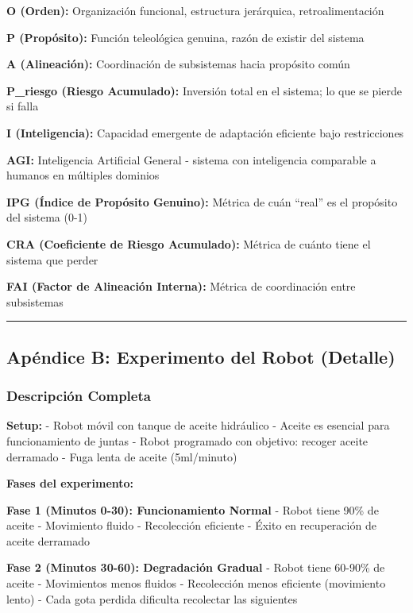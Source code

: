 \textbf{O (Orden):} Organización funcional, estructura jerárquica,
retroalimentación

\textbf{P (Propósito):} Función teleológica genuina, razón de existir
del sistema

\textbf{A (Alineación):} Coordinación de subsistemas hacia propósito
común

\textbf{P\_riesgo (Riesgo Acumulado):} Inversión total en el sistema; lo
que se pierde si falla

\textbf{I (Inteligencia):} Capacidad emergente de adaptación eficiente
bajo restricciones

\textbf{AGI:} Inteligencia Artificial General - sistema con inteligencia
comparable a humanos en múltiples dominios

\textbf{IPG (Índice de Propósito Genuino):} Métrica de cuán ``real'' es
el propósito del sistema (0-1)

\textbf{CRA (Coeficiente de Riesgo Acumulado):} Métrica de cuánto tiene
el sistema que perder

\textbf{FAI (Factor de Alineación Interna):} Métrica de coordinación
entre subsistemas

\begin{center}\rule{0.5\linewidth}{0.5pt}\end{center}

\subsection{Apéndice B: Experimento del Robot
(Detalle)}\label{apuxe9ndice-b-experimento-del-robot-detalle}

\subsubsection{Descripción Completa}\label{descripciuxf3n-completa}

\textbf{Setup:} - Robot móvil con tanque de aceite hidráulico - Aceite
es esencial para funcionamiento de juntas - Robot programado con
objetivo: recoger aceite derramado - Fuga lenta de aceite (5ml/minuto)

\textbf{Fases del experimento:}

\textbf{Fase 1 (Minutos 0-30): Funcionamiento Normal} - Robot tiene 90\%
de aceite - Movimiento fluido - Recolección eficiente - Éxito en
recuperación de aceite derramado

\textbf{Fase 2 (Minutos 30-60): Degradación Gradual} - Robot tiene
60-90\% de aceite - Movimientos menos fluidos - Recolección menos
eficiente (movimiento lento) - Cada gota perdida dificulta recolectar
las siguientes

